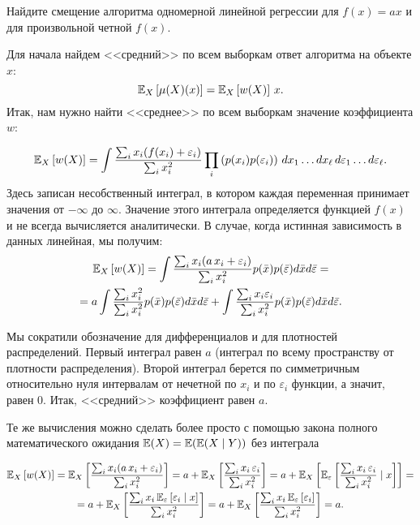 \documentclass[12pt,fleqn]{article}
\begin{document}
\begin{vkProblem}
    Найдите смещение алгоритма одномерной линейной регрессии для $f(x) = ax$ и для произвольной четной $f(x)$. 
\end{vkProblem}
\begin{esSolution}
    Для начала найдем <<средний>> по всем выборкам ответ алгоритма на объекте $x$:
    $$
    \mathbb{E}_{X}\left[\mu(X)(x)\right] = \mathbb{E}_{X}\left[w(X)\right] \, x.
    $$
    Итак, нам нужно найти <<среднее>> по всем выборкам значение коэффициента $w$:
    
    $$
    \mathbb{E}_{X}\left[w(X)\right] = \int \dfrac{\sum_i x_i (f(x_i)+\varepsilon_i)}{\sum_i x_i^2} \prod_i \left( p(x_i) p(\varepsilon_i) \right) \, dx_1 \dots dx_\ell \, d\varepsilon_1 \dots d\varepsilon_\ell.
    $$
    Здесь записан несобственный интеграл, в котором каждая переменная принимает значения от $-\infty$ до $\infty$. Значение этого интеграла определяется функцией $f(x)$ и не всегда вычисляется аналитически. В случае, когда истинная зависимость в данных линейная, мы получим:
    \begin{multline*}
    \mathbb{E}_{X}\left[w(X)\right]
    =
    \int \dfrac{\sum_i x_i (a\,x_i+\varepsilon_i)}{\sum_i x_i^2}  p(\bar x) p(\bar \varepsilon)  d \bar x d \bar \varepsilon
    = \\ =
    a \int \dfrac{\sum_i x_i^2}{\sum_i x_i^2}  p(\bar x)  p(\bar \varepsilon)  d \bar x d \bar \varepsilon
    +
    \int \dfrac{\sum_i x_i \varepsilon_i}{\sum_i x_i^2}  p(\bar x)  p(\bar \varepsilon)  d \bar x d \bar \varepsilon.
    \end{multline*}

    Мы сократили обозначение для дифференциалов и для плотностей распределений.
    Первый интеграл равен $a$ (интеграл по всему пространству от плотности распределения).
    Второй интеграл берется по симметричным относительно нуля интервалам от нечетной по $x_i$ и по $\varepsilon_i$ функции, а значит, равен 0.
    Итак, <<средний>> коэффициент равен $a$.

    Те же вычисления можно сделать более просто с помощью закона полного математического ожидания $\mathbb{E}(X) = \mathbb{E}(\mathbb{E}(X \mid Y))$ без интеграла

    \begin{multline*} 
    \mathbb{E}_{X}\left[w(X)\right]
    =
    \mathbb{E}_{X} \left[ \dfrac{\sum_i x_i (a\,x_i+\varepsilon_i)}{\sum_i x_i^2} \right]
    =
    a + \mathbb{E}_{X} \left[ \dfrac{\sum_i x_i \, \varepsilon_i}{\sum_i x_i^2} \right]
    =
    a + \mathbb{E}_{X} \left[\mathbb{E}_{\varepsilon} \left[ \dfrac{\sum_i x_i \, \varepsilon_i}{\sum_i x_i^2} \mid x\right] \right]
    = \\ =
    a + \mathbb{E}_{X} \left[\dfrac{\sum_i x_i \, \mathbb{E}_{\varepsilon} \left[\varepsilon_i \mid x\right]}{\sum_i x_i^2} \right]
    =
    a + \mathbb{E}_{X} \left[\dfrac{\sum_i x_i \, \mathbb{E}_{\varepsilon} \left[\varepsilon_i\right]}{\sum_i x_i^2} \right]
    =
    a.
    \end{multline*}
        

\end{esSolution}
\end{document}
